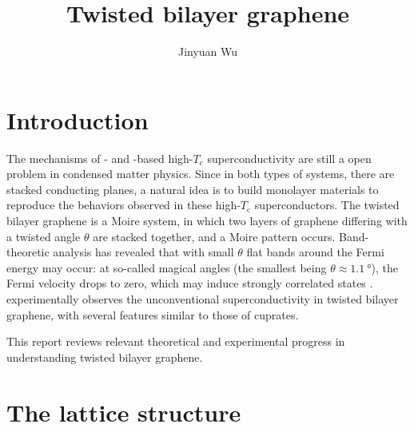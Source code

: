 \documentclass[hyperref, a4paper]{article}
\title{Twisted bilayer graphene}
\author{Jinyuan Wu}
\begin{document}
    
\maketitle

\section{Introduction}

The mechanisms of - and -based high-$T_{\text{c}}$ superconductivity 
are still a open problem in condensed matter physics.
Since in both types of systems, 
there are stacked conducting planes, 
a natural idea is to build monolayer materials to reproduce the behaviors observed in 
these high-$T_{\text{c}}$ superconductors.
The twisted bilayer graphene is a Moire system,
in which two layers of graphene differing with a twisted angle $\theta$
are stacked together,
and a Moire pattern occurs.
Band-theoretic analysis has revealed that with small $\theta$
flat bands around the Fermi energy may occur:
at so-called magical angles (the smallest being $\theta \approx \SI{1.1}{\degree}$), 
the Fermi velocity drops to zero,
which may induce strongly correlated states \cite{bistritzer_moire_2011}.
\cite{cao_unconventional_2018} experimentally observes the unconventional superconductivity
in twisted bilayer graphene,
with several features similar to those of cuprates.

This report reviews relevant theoretical and experimental progress in understanding twisted bilayer graphene.

\section{The lattice structure}\label{sec:lattice}
\end{document}
